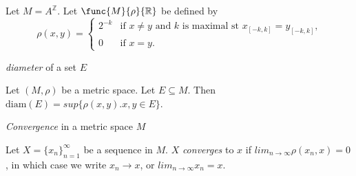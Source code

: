Let $M = A^\mathbb{Z}$.
Let $\func{M}{\rho}{\mathbb{R}}$ be defined by
\[
\rho(x,y) =
\begin{cases}
   2^{-k} & \text{if $x \neq y$ and $k$ is maximal st $x_{[-k,k]} = y_{[-k,k]}$,} \\
   0      & \text{if $x = y$.}
\end{cases}
\]

\edefi

\begdef
\textit{diameter} of a set $E$

Let $(M,\rho)$ be a metric space.
Let $E\subseteq M$.
Then $\mathrm{diam} ( E ) = sup \{ \rho ( x, y ) . x, y \in E \}$.
\edefi

\begdef
\textit{Convergence} in a metric space $M$

Let $X = \{ x_n \}_{n=1}^\infty$ be a sequence in $M$.
$X$ \textit{converges} to $x$ if $lim_{n \rightarrow \infty} \rho(x_n ,x) = 0$,
in which case we write $x_n \rightarrow x$, or $lim_{n \rightarrow \infty} x_n = x$.
\edefi
